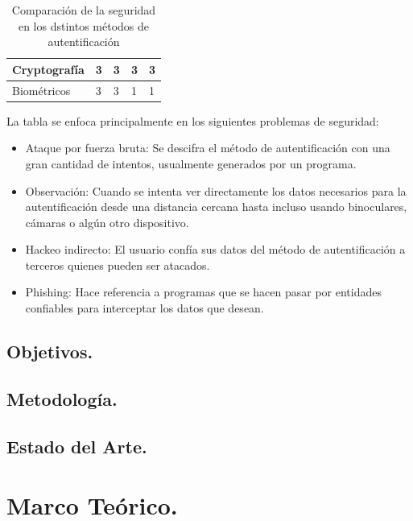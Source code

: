 \documentclass[12pt, a4paper, titlepage]{article}
\begin{document}
\begin{table}[htb]
{\begin{tabular}{l|l|l|l|l|}
						\multicolumn{1}{|l|}{Cryptografía}                                                     & 3                                                                 & 3           & 3                                                          & 3        \\ \hline
						\multicolumn{1}{|l|}{Biométricos}                                                      & 3                                                                 & 3           & 1                                                          & 1        \\ \hline
					\end{tabular}
				}
			\caption{Comparación de la seguridad en los dstintos métodos de autentificación}
			\end{table}
		La tabla se enfoca principalmente en los siguientes problemas de seguridad: 
		
		\begin{itemize}
			\item Ataque por fuerza bruta: Se descifra el método de autentificación con una gran cantidad de intentos, usualmente generados por un programa.
			\item Observación: Cuando se intenta ver directamente los datos necesarios para la autentificación desde una distancia cercana hasta incluso usando binoculares, cámaras o algún otro dispositivo.
			\item Hackeo indirecto: El usuario confía sus datos del método de autentificación a terceros quienes pueden ser atacados. 
			\item Phishing: Hace referencia a programas que se hacen pasar por entidades confiables para interceptar los datos que desean.
		\end{itemize}
			
	\newpage
		\subsection{Objetivos.}
		\subsection{Metodología.}
		\subsection{Estado del Arte.}
	\newpage
	\section{\textcolor{azulescom}{Marco Teórico.}}
\end{document}
